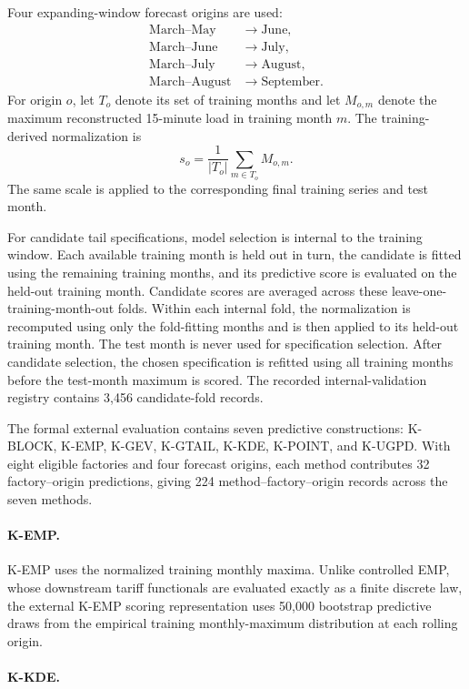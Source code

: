 \documentclass[AMA,Times1COL]{WileyNJDv5}
\begin{document}
Four expanding-window forecast origins are used:
\[
\begin{aligned}
\text{March--May}&\rightarrow\text{June},\\
\text{March--June}&\rightarrow\text{July},\\
\text{March--July}&\rightarrow\text{August},\\
\text{March--August}&\rightarrow\text{September}.
\end{aligned}
\]
For origin \(o\), let \(T_o\) denote its set of training months and
let \(M_{o,m}\) denote the maximum reconstructed 15-minute load in
training month \(m\). The training-derived normalization is
\[
s_o
=
\frac{1}{|T_o|}
\sum_{m\in T_o}
M_{o,m}.
\]
The same scale is applied to the corresponding final training series
and test month.

For candidate tail specifications, model selection is internal to the
training window. Each available training month is held out in turn,
the candidate is fitted using the remaining training months, and its
predictive score is evaluated on the held-out training month.
Candidate scores are averaged across these
leave-one-training-month-out folds. Within each internal fold, the
normalization is recomputed using only the fold-fitting months and is
then applied to its held-out training month. The test month is never
used for specification selection. After candidate selection, the
chosen specification is refitted using all training months before the
test-month maximum is scored. The recorded internal-validation
registry contains 3,456 candidate-fold records.

The formal external evaluation contains seven predictive
constructions:
K-BLOCK, K-EMP, K-GEV, K-GTAIL, K-KDE, K-POINT, and K-UGPD.
With eight eligible factories and four forecast origins, each method
contributes 32 factory--origin predictions, giving 224
method--factory--origin records across the seven methods.

\paragraph*{K-EMP.}

K-EMP uses the normalized training monthly maxima. Unlike controlled
EMP, whose downstream tariff functionals are evaluated exactly as a
finite discrete law, the external K-EMP scoring representation uses
50,000 bootstrap predictive draws from the empirical training
monthly-maximum distribution at each rolling origin.

\paragraph*{K-KDE.}
\end{document}

